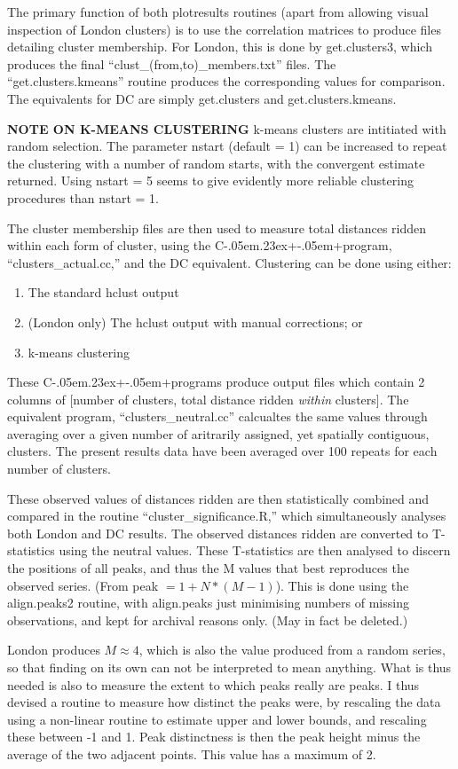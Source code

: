 \documentclass[a4paper,oneside]{article}
\def\CPP{{C\kern-.05em\raise.23ex\hbox{+\kern-.05em+}\hspace{4pt}}}
\begin{document}
The primary function of both plotresults routines (apart from allowing visual inspection of London clusters) is to use the correlation matrices
to produce files detailing cluster membership. For London, this is done by get.clusters3, which produces the final
``clust\_(from,to)\_members.txt'' files. The ``get.clusters.kmeans'' routine produces the corresponding values for comparison. The equivalents
for DC are simply get.clusters and get.clusters.kmeans.

{\bf NOTE ON K-MEANS CLUSTERING} k-means clusters are intitiated with random selection. The parameter nstart (default = 1) can be increased to
repeat the clustering with a number of random starts, with the convergent estimate returned. Using nstart = 5 seems to give evidently more
reliable clustering procedures than nstart = 1.

The cluster membership files are then used to measure total distances ridden within each form of cluster, using 
the \CPP program, ``clusters\_actual.cc,'' and the DC equivalent. Clustering can be done using either:
\begin{enumerate}
    \item{The standard hclust output}
    \item{(London only) The hclust output with manual corrections; or}
    \item{k-means clustering}
\end{enumerate}
These \CPP programs produce output files which contain 2 columns of [number of clusters, total distance ridden {\it within} clusters]. The
equivalent program, ``clusters\_neutral.cc'' calcualtes the same values through averaging over a given number of aritrarily assigned, yet
spatially contiguous, clusters. The present results data have been averaged over 100 repeats for each number of clusters. 

These observed values of distances ridden are then statistically combined and compared in the routine ``cluster\_significance.R,'' which
simultaneously analyses both London and DC results. The observed distances ridden are converted to T-statistics using the neutral values. These
T-statistics are then analysed to discern the positions of all peaks, and thus the M values that best reproduces the observed series. (From
peak $=1+N*(M-1)$). This is done using the align.peaks2 routine, with align.peaks just minimising numbers of missing observations, and kept for
archival reasons only. (May in fact be deleted.)

London produces $M\approx 4$, which is also the value produced from a random series, so that finding on its own can not be
interpreted to mean anything. What is thus needed is also to measure the extent to which peaks really are peaks. I thus devised a routine to
measure how distinct the peaks were, by rescaling the data using a non-linear routine to estimate upper and lower bounds, and rescaling these
between -1 and 1. Peak distinctness is then the peak height minus the average of the two adjacent points. This value has a maximum of 2.
\end{document}
